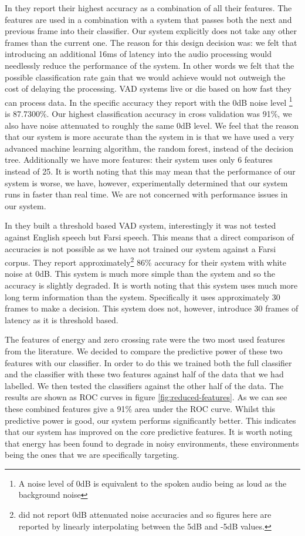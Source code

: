 \documentclass[ %
                    author={Sam Phippen},
                supervisor={Dr. Rafal Bogacz},
                     title={Real time voice activity detectors in noisy personal computing environments},
                  subtitle={},
                    degree={MEng},
                      year={2012} ]{thesis}
\begin{document}
In \cite{shin} they report their highest accuracy as a combination of all their
features. The features are used in a combination with a system that passes both
the next and previous frame into their classifier. Our system explicitly does
not take any other frames than the current one. The reason for this design
decision was: we felt that introducing an additional 16ms of latency into the
audio processing would needlessly reduce the performance of the system. In
other words we felt that the possible classification rate gain that we would
achieve would not outweigh the cost of delaying the processing. VAD systems
live or die based on how fast they can process data. In \cite{shin} the
specific accuracy they report with the 0dB noise level \footnote{A noise level
of 0dB is equivalent to the spoken audio being as loud as the background noise}
is 87.7300\%. Our highest classification accuracy in cross validation was 91\%,
we also have noise attenuated to roughly the same 0dB level.  We feel that the
reason that our system is more accurate than the system in \cite{shin} is that
we have used a very advanced machine learning algorithm, the random forest,
instead of the decision tree. Additionally we have more features: their system
uses only 6 features instead of 25. It is worth noting that this may mean that
the performance of our system is worse, we have, however, experimentally
determined that our system runs in faster than real time. We are not concerned
with performance issues in our system.

In \cite{moattar} they built a threshold based VAD system, interestingly it was
not tested against English speech but Farsi speech. This means that a direct
comparison of accuracies is not possible as we have not trained our system
against a Farsi corpus. They report approximately\footnote{\cite{moattar} did
not report 0dB attenuated noise accuracies and so figures here are reported by
linearly interpolating between the 5dB and -5dB values.} 86\% accuracy for
their system with white noise at 0dB. This system is much more simple than the
\cite{shin} system and so the accuracy is slightly degraded. It is worth noting
that this system uses much more long term information than the \cite{shin}
system. Specifically it uses approximately 30 frames to make a decision. This
system does not, however, introduce 30 frames of latency as it is threshold
based.

The features of energy and zero crossing rate were the two most used features
from the literature. We decided to compare the predictive power of these two
features with our classifier. In order to do this we trained both the full
classifier and the classifier with these two features against half of the data
that we had labelled.  We then tested the classifiers against the other half of
the data. The results are shown as ROC curves in figure \ref{fig:reduced-features}. As
we can see these combined features give a 91\% area under the ROC curve. Whilst
this predictive power is good, our system performs significantly better. This
indicates that our system has improved on the core predictive features. It is
worth noting that energy has been found to degrade in noisy environments, these
environments being the ones that we are specifically targeting.
\end{document}
